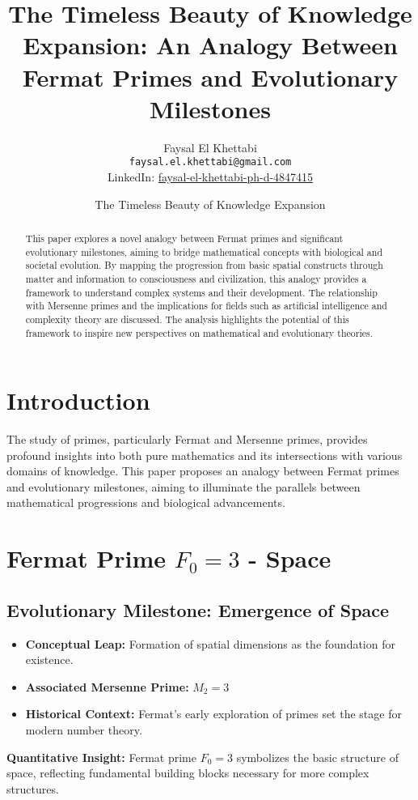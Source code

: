 \documentclass[12pt]{article}
\title{The Timeless Beauty of Knowledge Expansion: An Analogy Between Fermat Primes and Evolutionary Milestones}
\author{Faysal El Khettabi \\ \texttt{faysal.el.khettabi@gmail.com} \\ LinkedIn: \href{https://www.linkedin.com/in/faysal-el-khettabi-ph-d-4847415/}{faysal-el-khettabi-ph-d-4847415}}
\date{The Timeless Beauty of Knowledge Expansion}
\begin{document}
\maketitle

\begin{abstract}
This paper explores a novel analogy between Fermat primes and significant evolutionary milestones, aiming to bridge mathematical concepts with biological and societal evolution. By mapping the progression from basic spatial constructs through matter and information to consciousness and civilization, this analogy provides a framework to understand complex systems and their development. The relationship with Mersenne primes and the implications for fields such as artificial intelligence and complexity theory are discussed. The analysis highlights the potential of this framework to inspire new perspectives on mathematical and evolutionary theories.
\end{abstract}

\section{Introduction}
The study of primes, particularly Fermat and Mersenne primes, provides profound insights into both pure mathematics and its intersections with various domains of knowledge. This paper proposes an analogy between Fermat primes and evolutionary milestones, aiming to illuminate the parallels between mathematical progressions and biological advancements.

\section{Fermat Prime \( F_0 = 3 \) - Space}
\subsection{Evolutionary Milestone: Emergence of Space}
\begin{itemize}
    \item \textbf{Conceptual Leap:} Formation of spatial dimensions as the foundation for existence.
    \item \textbf{Associated Mersenne Prime:} \( M_2 = 3 \)
    \item \textbf{Historical Context:} Fermat's early exploration of primes set the stage for modern number theory.
\end{itemize}

\textbf{Quantitative Insight:} Fermat prime \( F_0 = 3 \) symbolizes the basic structure of space, reflecting fundamental building blocks necessary for more complex structures.
\end{document}
